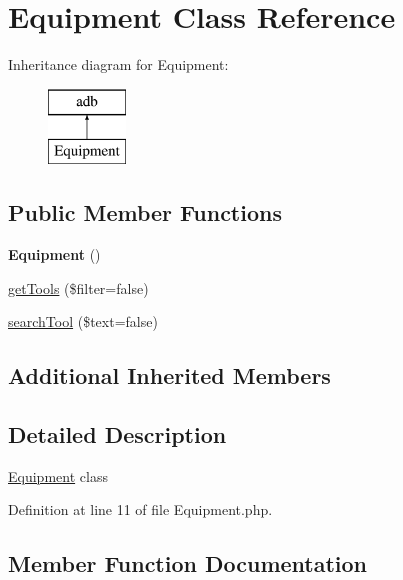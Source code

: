 \hypertarget{class_equipment}{}\section{Equipment Class Reference}
\label{class_equipment}
Inheritance diagram for Equipment\+:\begin{figure}[H]
\begin{center}
\leavevmode
\includegraphics[height=2.000000cm]{class_equipment}
\end{center}
\end{figure}
\subsection*{Public Member Functions}
\begin{DoxyCompactItemize}
\item 
{\bfseries Equipment} ()\hypertarget{class_equipment_a81f0201350767d4c312eb52edc72e397}{}\label{class_equipment_a81f0201350767d4c312eb52edc72e397}

\item 
\hyperlink{class_equipment_a25772ef2833dfcccf9b6dbf4aadbb115}{get\+Tools} (\$filter=false)
\item 
\hyperlink{class_equipment_a560107106e055caba491bd31b8ff4682}{search\+Tool} (\$text=false)
\end{DoxyCompactItemize}
\subsection*{Additional Inherited Members}


\subsection{Detailed Description}
\hyperlink{class_equipment}{Equipment} class 

Definition at line 11 of file Equipment.\+php.



\subsection{Member Function Documentation}
